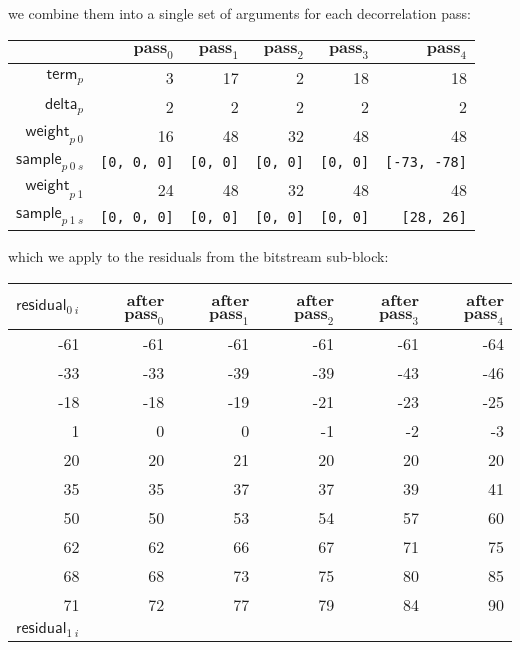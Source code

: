 {\par
\noindent
we combine them into a single set of arguments for each decorrelation pass:
\begin{table}[h]
{
  \begin{tabular}{|r|r|r|r|r|r|}
    \hline
    & $\textbf{pass}_0$ & $\textbf{pass}_1$ & $\textbf{pass}_2$ &
    $\textbf{pass}_3$ & $\textbf{pass}_4$ \\
    \hline
    $\textsf{term}_p$ & 3 & 17 & 2 & 18 & 18 \\
    $\textsf{delta}_p$ & 2 & 2 & 2 & 2 & 2 \\
    $\textsf{weight}_{p~0}$ & 16 & 48 & 32 & 48 & 48 \\
    $\textsf{sample}_{p~0~s}$ & \texttt{[0, 0, 0]} & \texttt{[0, 0]} &
    \texttt{[0, 0]} & \texttt{[0, 0]} & \texttt{[-73, -78]} \\
    $\textsf{weight}_{p~1}$ & 24 & 48 & 32 & 48 & 48 \\
    $\textsf{sample}_{p~1~s}$ & \texttt{[0, 0, 0]} & \texttt{[0, 0]} &
    \texttt{[0, 0]} & \texttt{[0, 0]} & \texttt{[28, 26]} \\
    \hline
  \end{tabular}
}
\end{table}
\par
\noindent
which we apply to the residuals from the bitstream sub-block:
\par
\noindent
{
  \begin{tabular}{|r|r|r|r|r|r|}
    \hline
    $\textsf{residual}_{0~i}$ &
    after $\textbf{pass}_0$ &
    after $\textbf{pass}_1$ &
    after $\textbf{pass}_2$ &
    after $\textbf{pass}_3$ &
    after $\textbf{pass}_4$ \\
    \hline
    -61 & -61 & -61 & -61 & -61 & -64 \\
    -33 & -33 & -39 & -39 & -43 & -46 \\
    -18 & -18 & -19 & -21 & -23 & -25 \\
    1 & 0 & 0 & -1 & -2 & -3 \\
    20 & 20 & 21 & 20 & 20 & 20 \\
    35 & 35 & 37 & 37 & 39 & 41 \\
    50 & 50 & 53 & 54 & 57 & 60 \\
    62 & 62 & 66 & 67 & 71 & 75 \\
    68 & 68 & 73 & 75 & 80 & 85 \\
    71 & 72 & 77 & 79 & 84 & 90 \\
    \hline
    \hline
    $\textsf{residual}_{1~i}$ &

\end{tabular}}}
